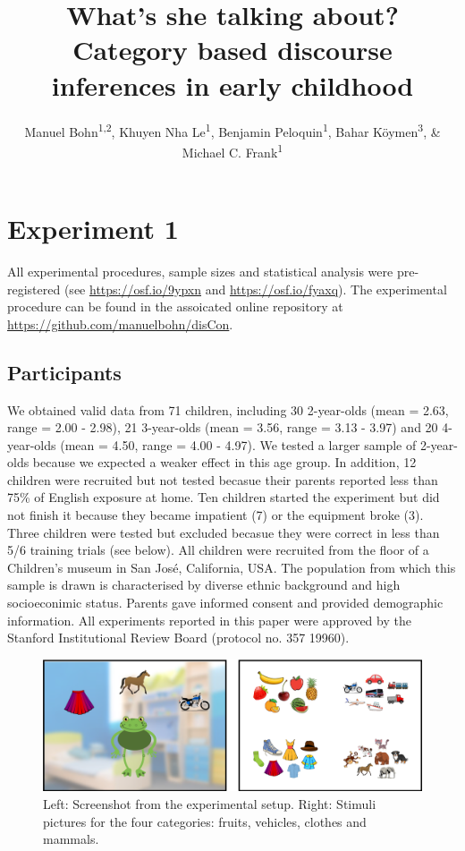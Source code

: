 \documentclass[man,floatsintext]{apa6}
\title{What's she talking about? Category based discourse inferences in early
childhood}
\author{Manuel Bohn\textsuperscript{1,2}, Khuyen Nha Le\textsuperscript{1},
Benjamin Peloquin\textsuperscript{1}, Bahar Köymen\textsuperscript{3},
\& Michael C. Frank\textsuperscript{1}}
\date{}
\affiliation{
\vspace{0.5cm}
\textsuperscript{1} Stanford University\\\textsuperscript{2} Leipzig University\\\textsuperscript{3} University of Manchester}
\begin{document}
\maketitle

\section{Experiment 1}\label{experiment-1}

All experimental procedures, sample sizes and statistical analysis were
pre-registered (see \url{https://osf.io/9ypxn} and
\url{https://osf.io/fyaxq}). The experimental procedure can be found in
the assoicated online repository at
\url{https://github.com/manuelbohn/disCon}.

\subsection{Participants}\label{participants}

We obtained valid data from 71 children, including 30 2-year-olds (mean
= 2.63, range = 2.00 - 2.98), 21 3-year-olds (mean = 3.56, range = 3.13
- 3.97) and 20 4-year-olds (mean = 4.50, range = 4.00 - 4.97). We tested
a larger sample of 2-year-olds because we expected a weaker effect in
this age group. In addition, 12 children were recruited but not tested
becasue their parents reported less than 75\% of English exposure at
home. Ten children started the experiment but did not finish it because
they became impatient (7) or the equipment broke (3). Three children
were tested but excluded becasue they were correct in less than 5/6
training trials (see below). All children were recruited from the floor
of a Children's museum in San José, California, USA. The population from
which this sample is drawn is characterised by diverse ethnic background
and high socioeconimic status. Parents gave informed consent and
provided demographic information. All experiments reported in this paper
were approved by the Stanford Institutional Review Board (protocol no.
357 19960).

\begin{figure}

{\centering \includegraphics[width=450px]{../figures/setup} 

}

\caption{Left: Screenshot from the experimental setup. Right: Stimuli pictures for the four categories: fruits, vehicles, clothes and mammals.}\label{fig:fig1}
\end{figure}
\end{document}
